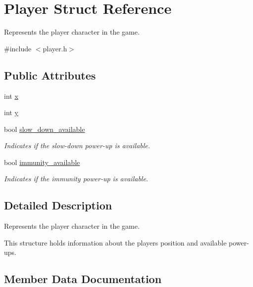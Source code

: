 \hypertarget{structPlayer}{}\section{Player Struct Reference}
\label{structPlayer}


Represents the player character in the game.  




{\ttfamily \#include $<$player.\+h$>$}

\subsection*{Public Attributes}
\begin{DoxyCompactItemize}
\item 
int \mbox{\hyperlink{structPlayer_ad285b3cb25e4a46ca944b9a416c1b13f}{x}}
\item 
int \mbox{\hyperlink{structPlayer_a6da29d6e3783c6028c92647bbde478f5}{y}}
\item 
bool \mbox{\hyperlink{structPlayer_a72cf5fd93edf473d84b70b1a77c27f1b}{slow\+\_\+down\+\_\+available}}
\begin{DoxyCompactList}\small\item\em Indicates if the slow-\/down power-\/up is available. \end{DoxyCompactList}\item 
bool \mbox{\hyperlink{structPlayer_acdb220fd1c78e47965627ce7f22138fd}{immunity\+\_\+available}}
\begin{DoxyCompactList}\small\item\em Indicates if the immunity power-\/up is available. \end{DoxyCompactList}\end{DoxyCompactItemize}


\subsection{Detailed Description}
Represents the player character in the game. 

This structure holds information about the player\textquotesingle{}s position and available power-\/ups. 

\subsection{Member Data Documentation}
\mbox{\label{structPlayer_acdb220fd1c78e47965627ce7f22138fd}} 
